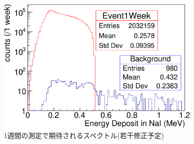 \begin{figure}[htbp]
	\centering
		\includegraphics[width=10cm]{fig/test_all.pdf}
	\caption{1週間の測定で期待されるスペクトル(若干修正予定)}
	\label{test_all}
\end{figure}

